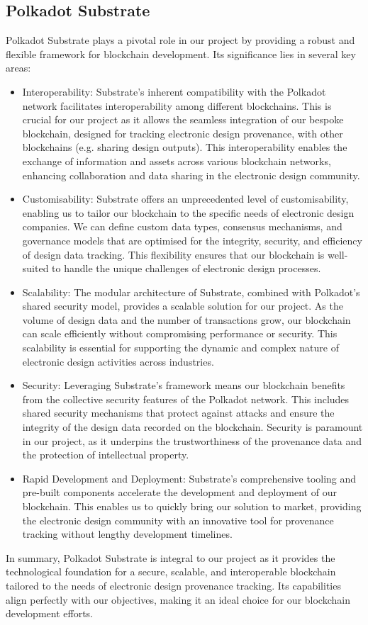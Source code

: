 \documentclass{tufte-handout}
\begin{document}
\subsection{Polkadot Substrate}
Polkadot Substrate plays a pivotal role in our project by providing a robust and flexible framework for blockchain development. Its significance lies in several
key areas:
\begin{itemize}
    \item Interoperability: Substrate's inherent compatibility with the Polkadot network facilitates interoperability among different blockchains. This is
    crucial for our project as it allows the seamless integration of our bespoke blockchain, designed for tracking electronic design provenance, with other
    blockchains (e.g. sharing design outputs). This interoperability enables the exchange of information and assets across various blockchain networks, enhancing
    collaboration and data sharing in the electronic design community.
    \item Customisability: Substrate offers an unprecedented level of customisability, enabling us to tailor our blockchain to the specific needs of electronic
    design companies. We can define custom data types, consensus mechanisms, and governance models that are optimised for the integrity, security, and
    efficiency of design data tracking. This flexibility ensures that our blockchain is well-suited to handle the unique challenges of electronic design processes.
    \item Scalability: The modular architecture of Substrate, combined with Polkadot's shared security model, provides a scalable solution for our project. As the
    volume of design data and the number of transactions grow, our blockchain can scale efficiently without compromising performance or security. This scalability
    is essential for supporting the dynamic and complex nature of electronic design activities across industries.
    \item Security: Leveraging Substrate's framework means our blockchain benefits from the collective security features of the Polkadot network. This includes
    shared security mechanisms that protect against attacks and ensure the integrity of the design data recorded on the blockchain. Security is paramount in our
    project, as it underpins the trustworthiness of the provenance data and the protection of intellectual property.
    \item Rapid Development and Deployment: Substrate's comprehensive tooling and pre-built components accelerate the development and deployment of our blockchain.
    This enables us to quickly bring our solution to market, providing the electronic design community with an innovative tool for provenance tracking without
    lengthy development timelines.
\end{itemize}
In summary, Polkadot Substrate is integral to our project as it provides the technological foundation for a secure, scalable, and interoperable blockchain
tailored to the needs of electronic design provenance tracking. Its capabilities align perfectly with our objectives, making it an ideal choice for our
blockchain development efforts.
\end{document}
